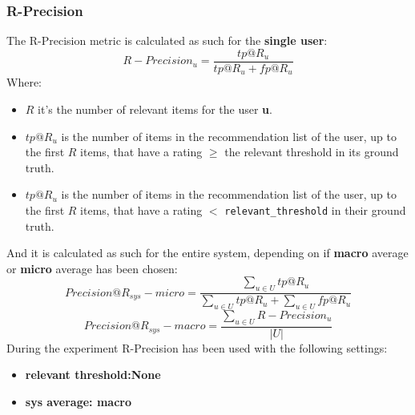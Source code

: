 \documentclass[11pt]{article}
\begin{document}
\subsubsection{R-Precision}\label{subsubsec:r-prec}
The R-Precision metric is calculated as such for the \textbf{single user}:
\hfill\break
\hfill\break
    \[
        R-Precision_u = \frac{tp@R_u}{tp@R_u + fp@R_u}
    \]
\hfill\break
\hfill\break
    Where:
\begin{itemize}
    \item $R$ it's the number of relevant items for the user \textbf{u}.
    \item $tp@R_u$ is the number of items in the recommendation list of the user, up to the first   $R$ items,
        that have a rating $\geq$ the relevant threshold in its ground truth.
    \item $tp@R_u$ is the number of items in the recommendation list of the user, up to the first $R$ items,
        that have a rating $<$ \texttt{relevant\_threshold} in their ground truth.
\end{itemize}
\hfill\break
\hfill\break
And it is calculated as such for the entire system, depending on if \textbf{macro} average or \textbf{micro} average
has been chosen:
\hfill\break
\hfill\break
    \[
        Precision@R_{sys} - micro = \frac{\sum_{u \in U} tp@R_u}{\sum_{u \in U} tp@R_u + \sum_{u \in U} fp@R_u}
    \]
\hfill\break
\hfill\break
    \[
        Precision@R_{sys} - macro = \frac{\sum_{u \in U} R-Precision_u}{|U|}
    \]
\hfill\break
\hfill\break
During the experiment R-Precision has been used with the following settings:
\begin{itemize}
    \item \textbf{relevant threshold:None }
    \item \textbf{sys average: macro }
\end{itemize}
\hfill\break
\hfill\break

\end{document}

